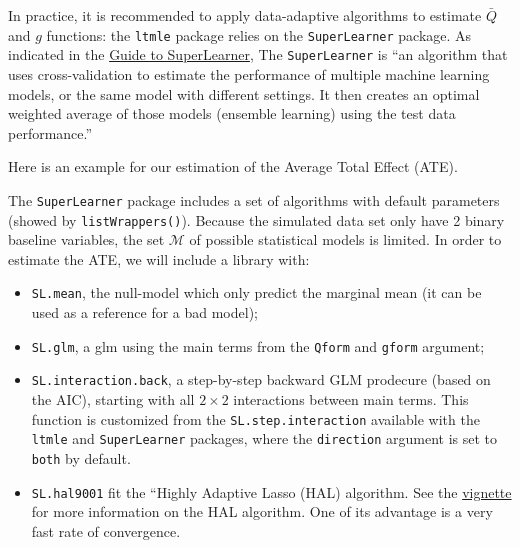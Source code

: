 \documentclass[
]{book}
\newenvironment{Shaded}{\begin{snugshade}}{\end{snugshade}}
\newcommand{\CommentTok}[1]{\textcolor[rgb]{0.56,0.35,0.01}{\textit{#1}}}
\newcommand{\FunctionTok}[1]{\textcolor[rgb]{0.13,0.29,0.53}{\textbf{#1}}}
\newcommand{\NormalTok}[1]{#1}
\newcommand{\SpecialCharTok}[1]{\textcolor[rgb]{0.81,0.36,0.00}{\textbf{#1}}}
\providecommand{\tightlist}{%
  \setlength{\itemsep}{0pt}\setlength{\parskip}{0pt}}
\begin{document}
\begin{Shaded}
\end{Shaded}

In practice, it is recommended to apply data-adaptive algorithms to estimate \(\bar{Q}\) and \(g\) functions: the \texttt{ltmle} package relies on the \texttt{SuperLearner} package. As indicated in the \href{https://cran.r-project.org/web/packages/SuperLearner/vignettes/Guide-to-SuperLearner.html}{Guide to SuperLearner},
The \texttt{SuperLearner} is ``an algorithm that uses cross-validation to estimate the performance of multiple machine learning models, or the same model with different settings. It then creates an optimal weighted average of those models (ensemble learning) using the test data performance.''

Here is an example for our estimation of the Average Total Effect (ATE).

The \texttt{SuperLearner} package includes a set of algorithms with default parameters (showed by \texttt{listWrappers()}). Because the simulated data set only have 2 binary baseline variables, the set \(\mathcal{M}\) of possible statistical models is limited. In order to estimate the ATE, we will include a library with:

\begin{itemize}
\tightlist
\item
  \texttt{SL.mean}, the null-model which only predict the marginal mean (it can be used as a reference for a bad model);
\item
  \texttt{SL.glm}, a glm using the main terms from the \texttt{Qform} and \texttt{gform} argument;
\item
  \texttt{SL.interaction.back}, a step-by-step backward GLM prodecure (based on the AIC), starting with all \(2 \times 2\) interactions between main terms. This function is customized from the \texttt{SL.step.interaction} available with the \texttt{ltmle} and \texttt{SuperLearner} packages, where the \texttt{direction} argument is set to \texttt{both} by default.
\item
  \texttt{SL.hal9001} fit the ``Highly Adaptive Lasso (HAL) algorithm. See the \href{https://cran.r-project.org/web//packages/hal9001/vignettes/intro_hal9001.html}{vignette} for more information on the HAL algorithm. One of its advantage is a very fast rate of convergence.
\end{itemize}
\end{document}
